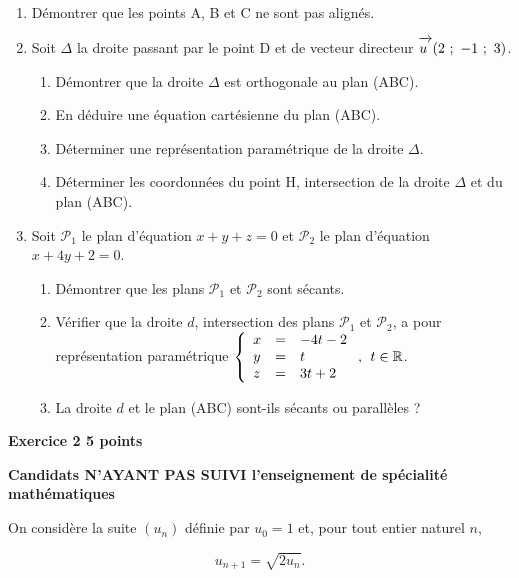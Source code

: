 \documentclass[10pt]{article}
\newcommand{\R}{\mathbb{R}}
\newcommand{\vect}[1]{\mathchoice%
{\overrightarrow{\displaystyle\mathstrut#1\,\,}}%
{\overrightarrow{\textstyle\mathstrut#1\,\,}}%
{\overrightarrow{\scriptstyle\mathstrut#1\,\,}}%
{\overrightarrow{\scriptscriptstyle\mathstrut#1\,\,}}}
\begin{document}
\begin{enumerate}
\item Démontrer que les points A, B et C ne sont pas alignés. 
\item Soit $\Delta$ la droite passant par le point D et de vecteur directeur  
$\vect{u}(2~;~- 1~;~3)$. 
	\begin{enumerate}
		\item Démontrer que la droite $\Delta$ est orthogonale au plan (ABC). 
		\item En déduire une équation cartésienne du plan (ABC). 
		\item Déterminer une représentation paramétrique de la droite $\Delta$. 
		\item Déterminer les coordonnées du point H, intersection de la droite $\Delta$ et du plan (ABC).
	\end{enumerate} 
\item Soit $\mathcal{P}_{1}$ le plan d'équation $x + y + z = 0$ et $\mathcal{P}_{2}$ le plan d'équation $x + 4y + 2 = 0$. 
	\begin{enumerate}
		\item Démontrer que les plans $\mathcal{P}_{1}$ et $\mathcal{P}_{2}$ sont sécants. 
		\item Vérifier que la droite $d$, intersection des plans $\mathcal{P}_{1}$ et $\mathcal{P}_{2}$, a pour représentation paramétrique 
$\left\{\begin{array}{l c l}
x&=&-4t-2\\ 
y &=&t\\ 
z &=& 3t + 2
\end{array}\right., \:\: t \in \R$. 
		\item La droite $d$ et le plan (ABC) sont-ils sécants ou parallèles ? 
	\end{enumerate}
\end{enumerate}

\vspace{0,5cm}

\textbf{Exercice 2 \hfill  5 points}

\textbf{Candidats N'AYANT PAS SUIVI l'enseignement de spécialité mathématiques}

\medskip
  
On considère la suite $\left(u_{n}\right)$ définie par $u_{0} = 1$ et, pour tout entier naturel $n$,

\[ u_{n+1} = \sqrt{2u_{n}}.\]
\end{document}
